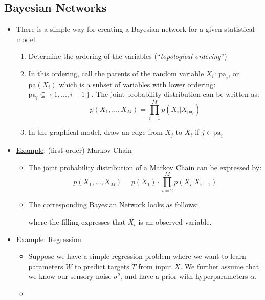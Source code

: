 \subsection{Bayesian Networks}
\begin{itemize}
	\item There is a simple way for creating a Bayesian network for a given statistical model.
	\begin{enumerate}
		\item Determine the ordering of the variables (``\textit{topological ordering}'')
		\item In this ordering, call the parents of the random variable $X_i$: $\text{pa}_i$, or $\text{pa}(X_i)$ which is a subset of variables with lower ordering: $\text{pa}_i \subseteq \left\{1,...,i-1\right\}$. The joint probability distribution can be written as:
		$$p(X_1,...,X_M) = \prod_{i=1}^{M}p(X_i|X_{\text{pa}_i})$$
		\item In the graphical model, draw an edge from $X_j$ to $X_i$ if $j\in \text{pa}_i$
	\end{enumerate}
	\item \underline{Example}: (first-order) Markov Chain
	\begin{itemize}
		\item The joint probability distribution of a Markov Chain can be expressed by:
		$$p(X_1,...,X_M)=p(X_1)\cdot \prod_{i=2}^{M} p(X_i|X_{i-1})$$
		\item The corresponding Bayesian Network looks as follows:
		\begin{figure}[ht!]
			\centering
		\end{figure}
	
		where the filling expresses that $X_i$ is an observed variable.
	\end{itemize}
	\item \underline{Example}: Regression
	\begin{itemize}
		\item Suppose we have a simple regression problem where we want to learn parameters $W$ to predict targets $T$ from input $X$. We further assume that we know our sensory noise $\sigma^2$, and have a prior with hyperparameters $\alpha$.
		\item 
		\begin{figure}[ht!]
			\centering
\end{figure}
\end{itemize}
\end{itemize}
